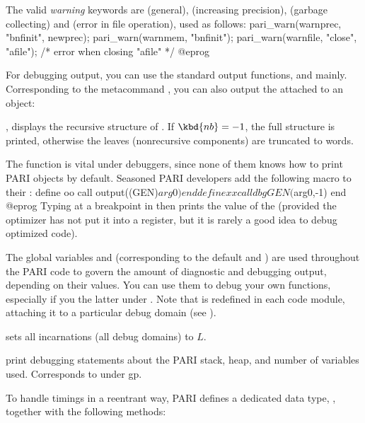 The valid \emph{warning} keywords are  (general), 
(increasing precision),  (garbage collecting) and 
(error in file operation), used as follows:
\bprog
    pari_warn(warnprec, "bnfinit", newprec);
    pari_warn(warnmem,  "bnfinit");
    pari_warn(warnfile, "close", "afile");  /* error when closing "afile" */
@eprog

\label{se:dbg_output}

For debugging output, you can use the standard output
functions,  and  mainly. Corresponding to the
 metacommand , you can also output the  attached to an object:

, displays the recursive structure of
. If $\kbd{nb} = -1$, the full structure is printed, otherwise
the leaves (nonrecursive components) are truncated to  words.

\noindent The function  is vital under debuggers, since none of
them knows how to print PARI objects by default. Seasoned PARI developers
add the following  macro to their :
\bprog
  define oo
    call output((GEN)$arg0)
  end
  define xx
    call dbgGEN($arg0,-1)
  end
@eprog\noindent
Typing  at a breakpoint in  then prints the value of the
  (provided the optimizer has not put it into a register, but
it is rarely a good idea to debug optimized code).

\noindent
The global variables  and  (corresponding
to the default  and )
are used throughout the PARI code to govern the amount of diagnostic and
debugging output, depending on their values. You can use them to debug your
own functions, especially if you  the latter under .
Note that  is redefined in each code module, attaching it to
a particular debug domain (see ).

 sets all  incarnations (all
debug domains) to $L$.

 print debugging statements about the PARI
stack, heap, and number of variables used. Corresponds to 
under gp.


\noindent To handle timings in a reentrant way, PARI defines a dedicated data
type, , together with the following methods:

